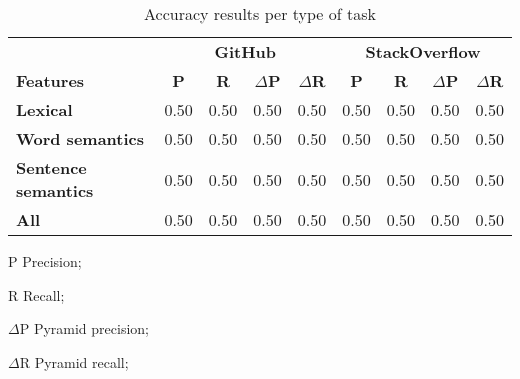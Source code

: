 \begin{table}[H]
\centering    
\begin{scriptsize}
\begin{threeparttable}
\begin{tabular}{lcccccccc}




& \multicolumn{4}{c}{\textbf{GitHub}}
& \multicolumn{4}{c}{\textbf{StackOverflow}}
\\ \cmidrule(l){2-5} \cmidrule(l){6-9}    


\textbf{Features} & 
\textbf{P} & \textbf{R} & $\Delta$\textbf{P} &  $\Delta$\textbf{R} &
\textbf{P} & \textbf{R} & $\Delta$\textbf{P} &  $\Delta$\textbf{R} \\


\hline

\textbf{Lexical} &
0.50 & 0.50 & 0.50 & 0.50 &
0.50 & 0.50 & 0.50 & 0.50 
\\

\textbf{Word semantics} &
0.50 & 0.50 & 0.50 & 0.50 &
0.50 & 0.50 & 0.50 & 0.50 
\\

\textbf{Sentence semantics} &
0.50 & 0.50 & 0.50 & 0.50 &
0.50 & 0.50 & 0.50 & 0.50 
\\

\hline
\textbf{All} &
0.50 & 0.50 & 0.50 & 0.50 &
0.50 & 0.50 & 0.50 & 0.50 
\\
\hline

\end{tabular}
\begin{tablenotes}
    \item[P] Precision; 
    \item[R] Recall;
    \item[$\Delta$P] Pyramid precision; 
    \item[$\Delta$R] Pyramid recall;
\end{tablenotes}
\end{threeparttable}
\end{scriptsize}
\caption{Accuracy results per type of task}
\label{tbl:approach-results-task}
\end{table}

